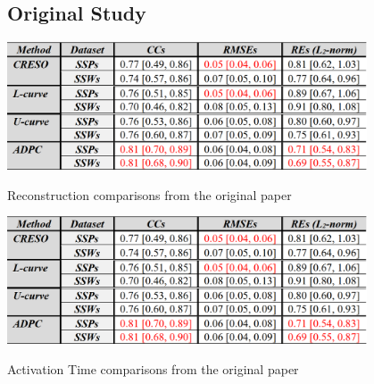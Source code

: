 \documentclass[draftcls, onecolumn, journal]{IEEEtran}
\begin{document}
\subsection{Original Study}

\begin{table}[h]
\centering
\includegraphics[width=0.8\textwidth]{../images/RecTable.png}
\caption{\label{tab:tabname}Reconstruction comparisons from the original paper}
\end{table}

\begin{table}[h]
    \centering
    \includegraphics[width=0.8\textwidth]{../images/RecTable.png}
    \caption{\label{tab:tabname}Activation Time comparisons from the original paper}
\end{table}



\newpage
\printbibliography
\end{document}
